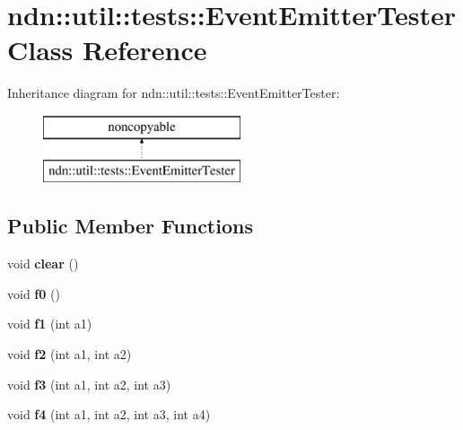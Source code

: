 \hypertarget{classndn_1_1util_1_1tests_1_1EventEmitterTester}{}\section{ndn\+:\+:util\+:\+:tests\+:\+:Event\+Emitter\+Tester Class Reference}
\label{classndn_1_1util_1_1tests_1_1EventEmitterTester}
Inheritance diagram for ndn\+:\+:util\+:\+:tests\+:\+:Event\+Emitter\+Tester\+:\begin{figure}[H]
\begin{center}
\leavevmode
\includegraphics[height=2.000000cm]{classndn_1_1util_1_1tests_1_1EventEmitterTester}
\end{center}
\end{figure}
\subsection*{Public Member Functions}
\begin{DoxyCompactItemize}
\item 
void {\bfseries clear} ()\hypertarget{classndn_1_1util_1_1tests_1_1EventEmitterTester_a29515b2c6038bbd3d989fbbb8bcd060a}{}\label{classndn_1_1util_1_1tests_1_1EventEmitterTester_a29515b2c6038bbd3d989fbbb8bcd060a}

\item 
void {\bfseries f0} ()\hypertarget{classndn_1_1util_1_1tests_1_1EventEmitterTester_a206a4a6b509b437bd5de994123c7b17a}{}\label{classndn_1_1util_1_1tests_1_1EventEmitterTester_a206a4a6b509b437bd5de994123c7b17a}

\item 
void {\bfseries f1} (int a1)\hypertarget{classndn_1_1util_1_1tests_1_1EventEmitterTester_a09b7c2e797e135df7cda908e9351db1a}{}\label{classndn_1_1util_1_1tests_1_1EventEmitterTester_a09b7c2e797e135df7cda908e9351db1a}

\item 
void {\bfseries f2} (int a1, int a2)\hypertarget{classndn_1_1util_1_1tests_1_1EventEmitterTester_a7f49ba9b0a80eb0437023e35720185de}{}\label{classndn_1_1util_1_1tests_1_1EventEmitterTester_a7f49ba9b0a80eb0437023e35720185de}

\item 
void {\bfseries f3} (int a1, int a2, int a3)\hypertarget{classndn_1_1util_1_1tests_1_1EventEmitterTester_adbac0086b3fd0c77e4f8a3d21d2f2563}{}\label{classndn_1_1util_1_1tests_1_1EventEmitterTester_adbac0086b3fd0c77e4f8a3d21d2f2563}

\item 
void {\bfseries f4} (int a1, int a2, int a3, int a4)\hypertarget{classndn_1_1util_1_1tests_1_1EventEmitterTester_a7687844e8e0a6c26cf4db4174b26fcc6}{}\label{classndn_1_1util_1_1tests_1_1EventEmitterTester_a7687844e8e0a6c26cf4db4174b26fcc6}

\end{DoxyCompactItemize}
